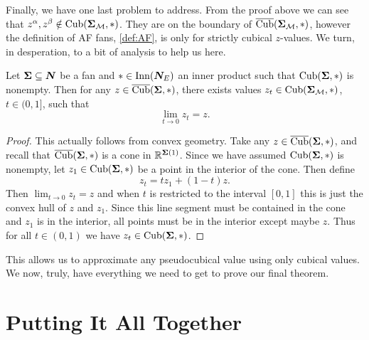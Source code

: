 \documentclass[12pt,oneside]{../../sfsuthesis}
\begin{document}
Finally, we have one last problem to address.
From the proof above we can see that \(  z^\alpha, z^\beta \notin \operatorname{Cub}({\bm{\Sigma}}_{\mathcal{M}}, \ast) \).
They are on the boundary of \( \operatorname{\overline{Cub}}({\bm{\Sigma}}_{\mathcal{M}}, \ast) \), however the definition of AF fans, \th\ref{def:AF}, is only for strictly cubical \( z \)-values.
We turn, in desperation, to a bit of analysis to help us here.
\begin{lemma}\th\label{thm:cubeLimit}
    Let \( {\bm{\Sigma}} \subseteq \bm{N} \) be a fan and \( \ast \in \operatorname{Inn}(\bm{N}_E) \) an inner product such that \( \operatorname{Cub}( {\bm{\Sigma}}, \ast) \) is nonempty.
    Then for any \( z \in \operatorname{\overline{Cub}}({\bm{\Sigma}}, \ast) \), there exists values \( z_t \in \operatorname{Cub}({\bm{\Sigma}}_{\mathcal{M}}, \ast) \), \( t \in (0, 1] \), such that
    \[
        \lim_{t \to 0} z_t = z.
    \]
\end{lemma}
\begin{proof}
    This actually follows from convex geometry.
    Take any \( z \in \operatorname{\overline{Cub}}( {\bm{\Sigma}}, \ast) \), and recall that \(  \operatorname{\overline{Cub}}( {\bm{\Sigma}}, \ast) \) is a cone in \( \mathbb{R}^{{\bm{\Sigma}}(1)} \).
    Since we have assumed \( \operatorname{Cub}( {\bm{\Sigma}}, \ast) \) is nonempty, let \( z_1 \in \operatorname{Cub}( {\bm{\Sigma}}, \ast) \) be a point in the interior of the cone.
    Then define
    \[
        z_t = t z_1 + (1 - t)z.
    \]
    Then \( \lim_{t \to 0} z_t = z \) and when \( t \) is restricted to the interval \( [0,1] \) this is just the convex hull of \( z \) and \( z_1 \).
    Since this line segment must be contained in the cone and \( z_1 \) is in the interior, all points must be in the interior except maybe \( z \).
    Thus for all \( t \in (0,1) \) we have \( z_t \in \operatorname{Cub}( {\bm{\Sigma}}, \ast) \).
\end{proof}
This allows us to approximate any pseudocubical value using only cubical values.
We now, truly, have everything we need to get to prove our final theorem.

\section{Putting It All Together}
\end{document}
